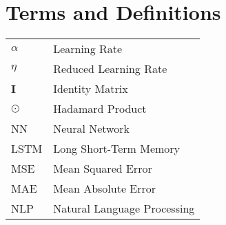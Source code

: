 \documentclass[a4paper,12pt,hidelinks]{report}
\begin{document}
\nocite{*}

\chapter*{Terms and Definitions}
\begin{tabular}{l | l}
\(\alpha\) & Learning Rate \\
\(\eta\) & Reduced Learning Rate \\
\textbf{I} & Identity Matrix \\
\(\odot\)& Hadamard Product \\
NN & Neural Network \\
LSTM & Long Short-Term Memory \\
MSE & Mean Squared Error \\
MAE & Mean Absolute Error \\
NLP & Natural Language Processing \\
\end{tabular}

\newpage








%
\end{document}
